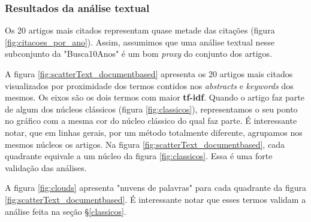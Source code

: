 \documentclass[sigconf]{acmart}
\begin{document}
\subsubsection{Resultados da análise textual}
Os 20 artigos mais citados representam quase metade das citações (figura \ref{fig:citacoes_por_ano}). Assim, assumimos que uma análise textual nesse subconjunto da "Busca10Anos" é um bom \emph{proxy} do conjunto dos artigos. 

A figura \ref{fig:scatterText_documentbased} apresenta os 20 artigos mais citados visualizados por proximidade dos termos contidos nos \emph{abstracts} e \emph{keywords} dos mesmos.  Os eixos são os dois termos com maior \textbf{tf-idf}. Quando o artigo faz parte de algum dos núcleos clássicos (figura \ref{fig:classicos}), representamos o seu ponto no gráfico com a mesma cor do núcleo clássico do qual faz parte.
É interessante notar, que em linhas gerais, por um método totalmente diferente, agrupamos nos mesmos núcleos os artigos. Na figura \ref{fig:scatterText_documentbased}, cada quadrante equivale a um núcleo da figura \ref{fig:classicos}.  Essa é uma forte validação das análises.

A figura \ref{fig:clouds} apresenta "nuvens de palavras" para cada quadrante da figura \ref{fig:scatterText_documentbased}. É interessante notar que esses termos validam a análise feita na seção \S\ref{classicos}.
\end{document}

